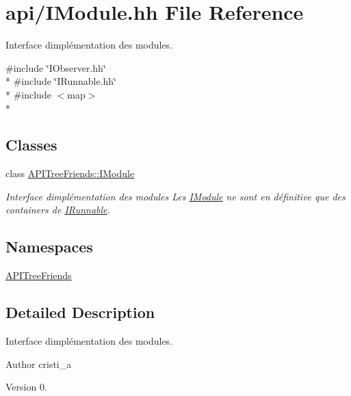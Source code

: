\hypertarget{_i_module_8hh}{}\section{api/\+I\+Module.hh File Reference}
\label{_i_module_8hh}


Interface d\textquotesingle{}implémentation des modules.  


{\ttfamily \#include \char`\"{}I\+Observer.\+hh\char`\"{}}\\*
{\ttfamily \#include \char`\"{}I\+Runnable.\+hh\char`\"{}}\\*
{\ttfamily \#include $<$map$>$}\\*
\subsection*{Classes}
\begin{DoxyCompactItemize}
\item 
class \hyperlink{class_a_p_i_tree_friends_1_1_i_module}{A\+P\+I\+Tree\+Friends\+::\+I\+Module}
\begin{DoxyCompactList}\small\item\em Interface d\textquotesingle{}implémentation des modules Les \hyperlink{class_a_p_i_tree_friends_1_1_i_module}{I\+Module} ne sont en définitive que des containers de \hyperlink{class_a_p_i_tree_friends_1_1_i_runnable}{I\+Runnable}. \end{DoxyCompactList}\end{DoxyCompactItemize}
\subsection*{Namespaces}
\begin{DoxyCompactItemize}
\item 
 \hyperlink{namespace_a_p_i_tree_friends}{A\+P\+I\+Tree\+Friends}
\end{DoxyCompactItemize}


\subsection{Detailed Description}
Interface d\textquotesingle{}implémentation des modules. 

\begin{DoxyAuthor}{Author}
cristi\+\_\+a 
\end{DoxyAuthor}
\begin{DoxyVersion}{Version}
0. 
\end{DoxyVersion}
